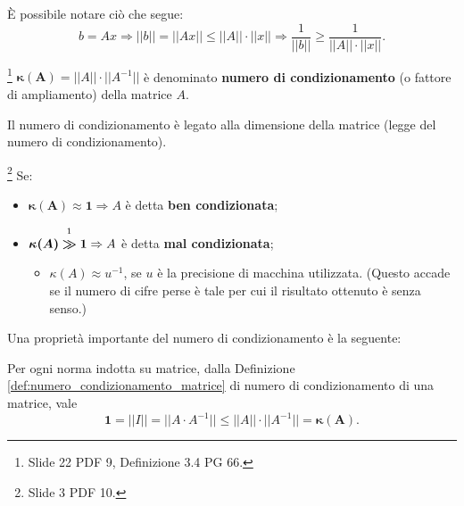 È possibile notare ciò che segue:
\begin{equation*}
    b=Ax\Rightarrow ||b||=||Ax||\leq ||A||\cdot||x||\Rightarrow\frac{1}{||b||}\geq \frac{1}{||A||\cdot||x||}.
\end{equation*}

\begin{definition}\label{def:numero_condizionamento_matrice} \footnote{Slide 22 PDF 9, Definizione 3.4 PG 66.}
    $\boldsymbol{\kappa(A)}=||A||\cdot||A^{-1}||$ è denominato \textbf{numero di condizionamento} (o fattore di ampliamento) della matrice $A$.
\end{definition}

Il numero di condizionamento è legato alla dimensione della matrice (legge del numero di condizionamento).

\begin{remark}\footnote{Slide 3 PDF 10.}
	Se:
	\begin{itemize}
		\item $\boldsymbol{\kappa(A)\approx 1}\Rightarrow A$ è detta \textbf{ben condizionata};
		\item $\boldsymbol{\kappa(A)}\overset{\footnotemark}{\boldsymbol\gg}\boldsymbol 1 \Rightarrow A$ è detta \textbf{mal condizionata};
		\begin{itemize}
			\item $\kappa(A)\approx u^{-1}$, se $u$ è la precisione di macchina utilizzata. (Questo accade se il numero di cifre perse è tale per cui il risultato ottenuto è senza senso.)
		\end{itemize}
	\end{itemize}
\end{remark}

Una proprietà importante del numero di condizionamento è la seguente:
\begin{remark}
	Per ogni norma indotta su matrice, dalla Definizione \ref{def:numero_condizionamento_matrice} di numero di condizionamento di una matrice, vale
	\begin{equation*}
		\boldsymbol 1 = ||I||=||A\cdot A^{-1}||\boldsymbol\leq ||A||\cdot||A^{-1}||=\boldsymbol{\kappa(A)}.
	\end{equation*}
\end{remark}

